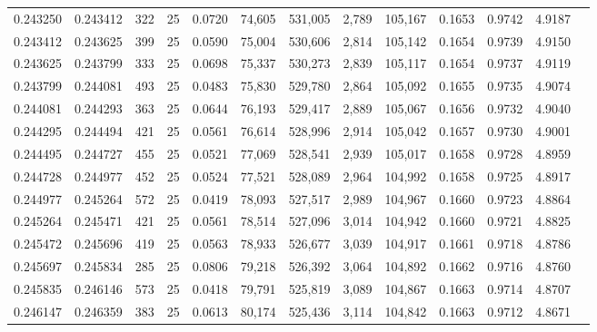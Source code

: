 \begin{tabular}{rrrrrrrrrrrrr}
0.243250 & 0.243412 &   322 &  25 &                                     0.0720 &  74,605 & 531,005 &   2,789 & 105,167 & 0.1653 & 0.9742 & 4.9187 \\
0.243412 & 0.243625 &   399 &  25 &                                     0.0590 &  75,004 & 530,606 &   2,814 & 105,142 & 0.1654 & 0.9739 & 4.9150 \\
0.243625 & 0.243799 &   333 &  25 &                                     0.0698 &  75,337 & 530,273 &   2,839 & 105,117 & 0.1654 & 0.9737 & 4.9119 \\
0.243799 & 0.244081 &   493 &  25 &                                     0.0483 &  75,830 & 529,780 &   2,864 & 105,092 & 0.1655 & 0.9735 & 4.9074 \\
0.244081 & 0.244293 &   363 &  25 &                                     0.0644 &  76,193 & 529,417 &   2,889 & 105,067 & 0.1656 & 0.9732 & 4.9040 \\
0.244295 & 0.244494 &   421 &  25 &                                     0.0561 &  76,614 & 528,996 &   2,914 & 105,042 & 0.1657 & 0.9730 & 4.9001 \\
0.244495 & 0.244727 &   455 &  25 &                                     0.0521 &  77,069 & 528,541 &   2,939 & 105,017 & 0.1658 & 0.9728 & 4.8959 \\
0.244728 & 0.244977 &   452 &  25 &                                     0.0524 &  77,521 & 528,089 &   2,964 & 104,992 & 0.1658 & 0.9725 & 4.8917 \\
0.244977 & 0.245264 &   572 &  25 &                                     0.0419 &  78,093 & 527,517 &   2,989 & 104,967 & 0.1660 & 0.9723 & 4.8864 \\
0.245264 & 0.245471 &   421 &  25 &                                     0.0561 &  78,514 & 527,096 &   3,014 & 104,942 & 0.1660 & 0.9721 & 4.8825 \\
0.245472 & 0.245696 &   419 &  25 &                                     0.0563 &  78,933 & 526,677 &   3,039 & 104,917 & 0.1661 & 0.9718 & 4.8786 \\
0.245697 & 0.245834 &   285 &  25 &                                     0.0806 &  79,218 & 526,392 &   3,064 & 104,892 & 0.1662 & 0.9716 & 4.8760 \\
0.245835 & 0.246146 &   573 &  25 &                                     0.0418 &  79,791 & 525,819 &   3,089 & 104,867 & 0.1663 & 0.9714 & 4.8707 \\
0.246147 & 0.246359 &   383 &  25 &                                     0.0613 &  80,174 & 525,436 &   3,114 & 104,842 & 0.1663 & 0.9712 & 4.8671 \\

\end{tabular}
